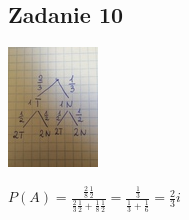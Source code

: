 \subsection{Zadanie 10}

\includegraphics{./tydzien_03/zad_10.jpg}

$P(A) = \frac{\frac{2}{8}\frac{1}{2}}{\frac{2}{3}\frac{1}{2} + \frac{1}{8}\frac{1}{2}}
 = \frac{\frac{1}{3}}{\frac{1}{3} + \frac{1}{6}} = \frac{2}{3}i$

